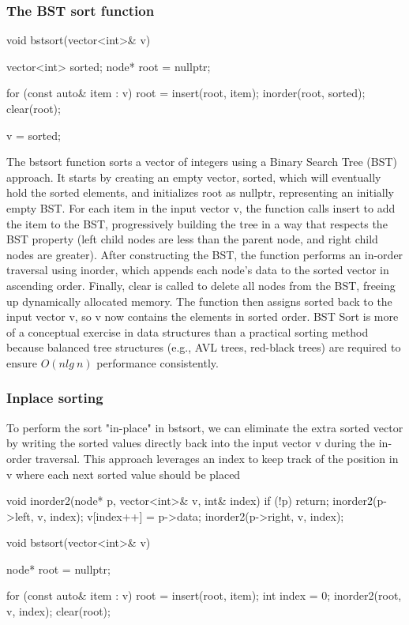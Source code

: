 \documentclass{report}
\begin{document}
\pagebreak \bigbreak \noindent 
\subsubsection{The BST sort function}
\bigbreak \noindent 
\begin{cppcode}
    void bstsort(vector<int>& v) {
        vector<int> sorted;
        node* root = nullptr;

        for (const auto& item : v) {
            root = insert(root, item);
        }
        inorder(root, sorted);
        clear(root);

        v = sorted;
    }
\end{cppcode}
\bigbreak \noindent 
The bstsort function sorts a vector of integers using a Binary Search Tree (BST) approach. It starts by creating an empty vector, sorted, which will eventually hold the sorted elements, and initializes root as nullptr, representing an initially empty BST.
\bigbreak \noindent 
For each item in the input vector v, the function calls insert to add the item to the BST, progressively building the tree in a way that respects the BST property (left child nodes are less than the parent node, and right child nodes are greater). After constructing the BST, the function performs an in-order traversal using inorder, which appends each node’s data to the sorted vector in ascending order.
\bigbreak \noindent 
Finally, clear is called to delete all nodes from the BST, freeing up dynamically allocated memory. The function then assigns sorted back to the input vector v, so v now contains the elements in sorted order.
\bigbreak \noindent 
BST Sort is more of a conceptual exercise in data structures than a practical sorting method because balanced tree structures (e.g., AVL trees, red-black trees) are required to ensure $O(nlg\ n)$ performance consistently.

\pagebreak 
\subsubsection{Inplace sorting}
\bigbreak \noindent 
To perform the sort "in-place" in bstsort, we can eliminate the extra sorted vector by writing the sorted values directly back into the input vector v during the in-order traversal. This approach leverages an index to keep track of the position in v where each next sorted value should be placed
\bigbreak \noindent 
\begin{cppcode}
    void inorder2(node* p, vector<int>& v, int& index) {
        if (!p) return;
        inorder2(p->left, v, index);
        v[index++] = p->data;
        inorder2(p->right, v, index);
    }

    void bstsort(vector<int>& v) {
        node* root = nullptr;

        for (const auto& item : v) {
            root = insert(root, item);
        }
        int index = 0;
        inorder2(root, v, index);
        clear(root);
    }
\end{cppcode}
\end{document}
